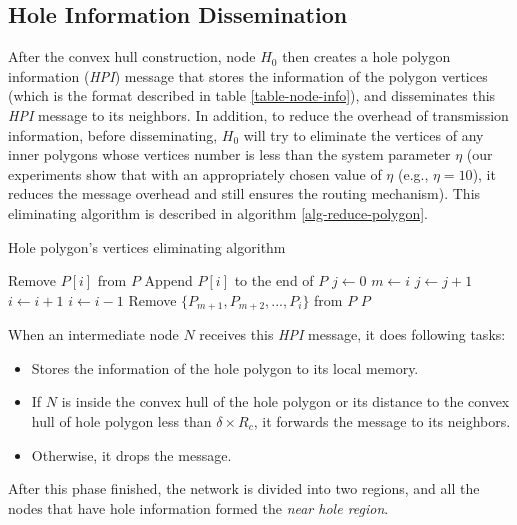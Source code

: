 \subsection{Hole Information Dissemination}
After the convex hull construction, node $H_0$ then creates a hole polygon information (\emph{HPI}) message that stores the information of the polygon vertices (which is the format described in table \ref{table-node-info}), and disseminates this \emph{HPI} message to its neighbors. In addition, to reduce the overhead of transmission information, before disseminating, $H_0$ will try to eliminate the vertices of any inner polygons whose vertices number is less than the system parameter $\eta$ (our experiments show that with an appropriately chosen value of $\eta$ (e.g., $\eta = 10$), it reduces the message overhead and still ensures the routing mechanism). This eliminating algorithm is described in algorithm \ref{alg-reduce-polygon}. 

\begin{algorithm}[!htb]
\SetAlgoLined
\caption{Hole polygon's vertices eliminating algorithm}
\label{alg-reduce-polygon}
 {
	 {
		Remove $P[i]$ from $P$\;
		Append $P[i]$ to the end of $P$\;
	}
	\lElse {
		\KwBreak
	}
}
 {
	 {
		$j \leftarrow 0$\;
		$m \leftarrow i$\;
		 {
			$j \leftarrow j + 1$\;
			$i \leftarrow i + 1$\;
		}
		$i \leftarrow i - 1$\;
		 {
			Remove $\{P_{m+1}, P_{m+2}, ..., P_{i}\}$ from $P$
		}
	}
}
\Return $P$\;
\end{algorithm}

When an intermediate node $N$ receives this \emph{HPI} message, it does following tasks:
\begin{itemize}
\item Stores the information of the hole polygon to its local memory.
\item If $N$ is inside the convex hull of the hole polygon or its distance to the convex hull of hole polygon less than $\delta \times R_c$, it forwards the message to its neighbors.
\item Otherwise, it drops the message.
\end{itemize}
After this phase finished, the network is divided into two regions, and all the nodes that have hole information formed the \emph{near hole region}.

